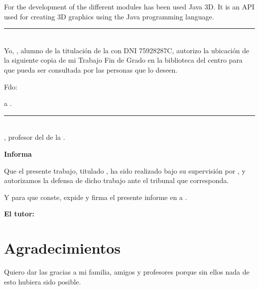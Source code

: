 For the development of the different modules has been used Java 3D. It is an API used for creating 3D graphics using the Java programming language.\\

\newpage


\thispagestyle{empty}

\noindent\rule[-1ex]{\textwidth}{2pt}\\[4.5ex]

Yo, \textbf{\myName}, alumno de la titulación \myDegree{} de la \textbf{\myFaculty} con DNI 75928287C, autorizo la
ubicación de la siguiente copia de mi Trabajo Fin de Grado en la biblioteca del centro para que pueda ser
consultada por las personas que lo deseen.

\vspace{6cm}

\noindent Fdo: \myName

\vspace{2cm}

\begin{flushright}
\myLocation a \myTime.
\end{flushright}

\newpage

\thispagestyle{empty}

\noindent\rule[-1ex]{\textwidth}{2pt}\\[4.5ex]

\textbf{\myProf}, profesor del \myDepartment de la \myUni.

\vspace{0.5cm}

\textbf{Informa}

\vspace{0.5cm}

Que el presente trabajo, titulado \textit{\textbf{\myTitle}},
ha sido realizado bajo su supervisión por \textbf{\myName}, y autorizamos la defensa de dicho trabajo ante el tribunal
que corresponda.

\vspace{0.5cm}

Y para que conste, expide y firma el presente informe en \myLocation a \myTime.

\vspace{1cm}

\textbf{El tutor:}

\vspace{5cm}

\noindent \textbf{\myProf}

\chapter*{Agradecimientos}
\thispagestyle{empty}

       \vspace{1cm}


Quiero dar las gracias a mi familia, amigos y profesores porque sin ellos nada de esto hubiera sido posible.

